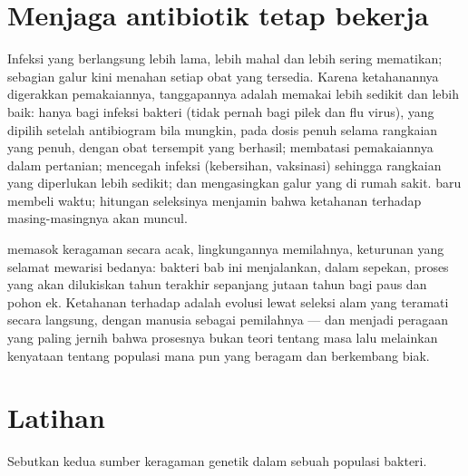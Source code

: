 \section{Menjaga antibiotik tetap bekerja}

\begin{proposition}\label{prop:g11:antibiotic-resistance:consequences}
Infeksi yang  berlangsung lebih lama, lebih mahal dan lebih sering
mematikan; sebagian galur kini menahan setiap obat yang tersedia.
Karena ketahanannya digerakkan pemakaiannya, tanggapannya adalah
memakai  lebih sedikit dan lebih baik: hanya bagi infeksi
bakteri (tidak pernah bagi pilek dan flu virus), yang dipilih setelah
antibiogram bila mungkin, pada dosis penuh selama rangkaian yang penuh,
dengan obat tersempit yang berhasil; membatasi pemakaiannya dalam
pertanian; mencegah infeksi (kebersihan, vaksinasi) sehingga rangkaian
yang diperlukan lebih sedikit; dan mengasingkan  galur yang
 di rumah sakit.  baru membeli waktu; hitungan
seleksinya menjamin bahwa ketahanan terhadap masing-masingnya akan muncul.
\end{proposition}
\admitted

\begin{remark}\label{rem:g11:antibiotic-resistance:evolution}
 memasok keragaman secara acak, lingkungannya memilahnya,
keturunan yang selamat mewarisi bedanya: bakteri bab ini menjalankan,
dalam sepekan, proses yang akan dilukiskan tahun terakhir sepanjang
jutaan tahun bagi paus dan pohon ek. Ketahanan terhadap 
adalah evolusi lewat seleksi alam yang teramati secara langsung, dengan
manusia sebagai pemilahnya --- dan menjadi peragaan yang paling jernih
bahwa prosesnya bukan teori tentang masa lalu melainkan kenyataan
tentang populasi mana pun yang beragam dan berkembang biak.
\end{remark}

\section{Latihan}

\begin{exercise}[$\star$]\label{exo:g11:antibiotic-resistance:1}
Sebutkan kedua sumber keragaman genetik dalam sebuah populasi bakteri.
\end{exercise}

